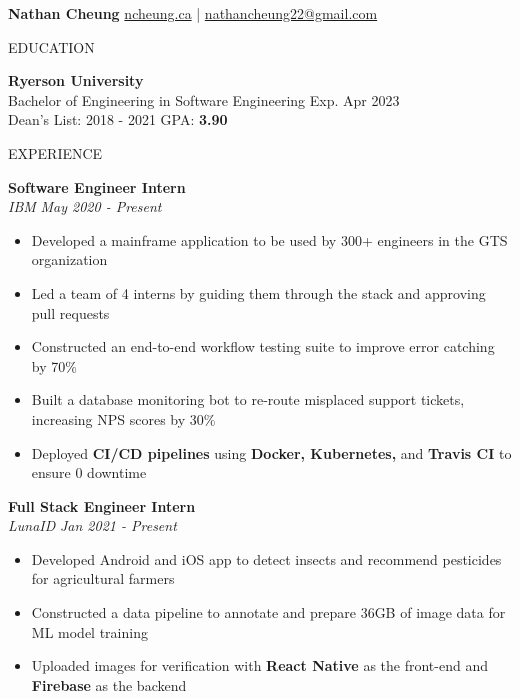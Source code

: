\documentclass[letterpaper,11pt,oneside]{article}
\newcommand{\createHeading}[1]{
    \vspace{1.25em}
    \hline
    \vspace{-1.5ex}
    \begin{center}
        #1
    \end{center}
    \vspace{-1.5ex}
    \hline
    \vspace{1.25em}
}
\begin{document}

\noindent \huge{\textbf{Nathan Cheung}} \hfill \normalsize{\href{https://ncheung.ca}{ncheung.ca} | \href{mailto:nathancheung22@gmail.com}{nathancheung22@gmail.com}}




\createHeading{EDUCATION}
\begin{addmargin}[.6em]{.6em}
    \textbf{Ryerson University} \\
    Bachelor of Engineering in Software Engineering \hfill Exp. Apr 2023 \\
    Dean's List: 2018 - 2021 \hfill GPA: \textbf{3.90}
\end{addmargin}

\createHeading{EXPERIENCE}
\begin{addmargin}[.6em]{.6em}
    \textbf{Software Engineer Intern} \\
    \textit{IBM} \hfill \textit{May 2020 - Present}
    \begin{itemize}
        \item Developed a mainframe application to be used by 300+ engineers in the GTS organization
        \item Led a team of 4 interns by guiding them through the stack and approving pull requests
        \item Constructed an end-to-end workflow testing suite to improve error catching by 70\%
        \item Built a database monitoring bot to re-route misplaced support tickets, increasing NPS scores by 30\%
        \item Deployed \textbf{CI/CD pipelines} using \textbf{Docker, Kubernetes,} and \textbf{Travis CI} to ensure 0 downtime
    \end{itemize}
    \vspace{1.25em}
    \textbf{Full Stack Engineer Intern} \\
    \textit{LunaID} \hfill \textit{Jan 2021 - Present}
    \begin{itemize}
        \item Developed Android and iOS app to detect insects and recommend pesticides for agricultural farmers
        \item Constructed a data pipeline to annotate and prepare 36GB of image data for ML model training
        \item Uploaded images for verification with \textbf{React Native} as the front-end and \textbf{Firebase} as the backend
    \end{itemize}
    \vspace{0.5em}
\end{addmargin}
\end{document}
